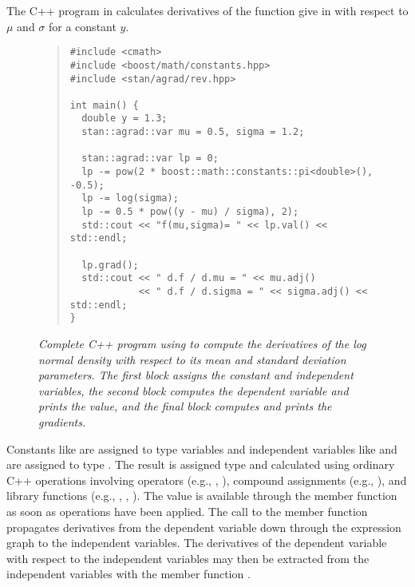 \documentclass[10pt]{article}
\begin{document}
The C++ program in  calculates
derivatives of the function give in  with
respect to $\mu$ and $\sigma$ for a constant $y$.
%
\begin{figure}
\begin{quote}
\small
\begin{Verbatim}
#include <cmath>
#include <boost/math/constants.hpp>
#include <stan/agrad/rev.hpp>

int main() { 
  double y = 1.3;
  stan::agrad::var mu = 0.5, sigma = 1.2;

  stan::agrad::var lp = 0;
  lp -= pow(2 * boost::math::constants::pi<double>(), -0.5);
  lp -= log(sigma);
  lp -= 0.5 * pow((y - mu) / sigma), 2);
  std::cout << "f(mu,sigma)= " << lp.val() << std::endl;

  lp.grad();
  std::cout << " d.f / d.mu = " << mu.adj()
            << " d.f / d.sigma = " << sigma.adj() << std::endl;
}
\end{Verbatim}
\end{quote}
\vspace*{-6pt}
\caption{\small\it Complete C++ program using  to
  compute the derivatives of the log normal density with respect to
  its mean and standard deviation parameters.  The first block assigns
  the constant and independent variables, the second block computes
  the dependent variable and prints the value, and the final block
  computes and prints the
  gradients.}\label{normal-log-gradient-cpp.figure}
\end{figure}
%
Constants like  are assigned to type  variables
and independent variables like  and  are assigned
to type .  The result  is assigned type 
and calculated using ordinary C++ operations involving operators
(e.g., \code{*}, \code{/}), compound assignments (e.g., \code{-=}),
and library functions (e.g., , , ).  The
value is available through the member function  as soon as
operations have been applied.  The call to the member function
 propagates derivatives from the dependent variable
 down through the expression graph to the independent
variables.  The derivatives of the dependent variable with respect to
the independent variables may then be extracted from the independent
variables with the member function .
\end{document}
